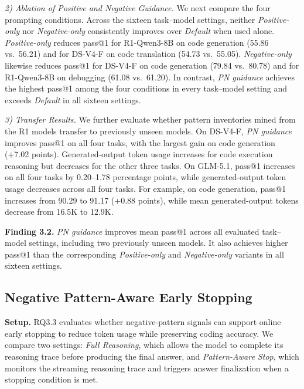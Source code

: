 \documentclass[acmsmall,screen,review,anonymous]{acmart}
\begin{document}
\textit{2) Ablation of Positive and Negative Guidance.}
We next compare the four prompting conditions. Across the sixteen task--model settings, neither \textit{Positive-only} nor \textit{Negative-only} consistently improves over \textit{Default} when used alone. \textit{Positive-only} reduces pass@1 for R1-Qwen3-8B on code generation (55.86 vs.\ 56.21) and for DS-V4-F on code translation (54.73 vs.\ 55.05). \textit{Negative-only} likewise reduces pass@1 for DS-V4-F on code generation (79.84 vs.\ 80.78) and for R1-Qwen3-8B on debugging (61.08 vs.\ 61.20). In contrast, \textit{PN guidance} achieves the highest pass@1 among the four conditions in every task--model setting and exceeds \textit{Default} in all sixteen settings.

\textit{3) Transfer Results.}
We further evaluate whether pattern inventories mined from the R1 models transfer to previously unseen models. On DS-V4-F, \textit{PN guidance} improves pass@1 on all four tasks, with the largest gain on code generation (+7.02 points). Generated-output token usage increases for code execution reasoning but decreases for the other three tasks. On GLM-5.1, pass@1 increases on all four tasks by 0.20--1.78 percentage points, while generated-output token usage decreases across all four tasks. For example, on code generation, pass@1 increases from 90.29 to 91.17 (+0.88 points), while mean generated-output tokens decrease from 16.5K to 12.9K.

\begin{tcolorbox}[width=\linewidth, boxrule=0.8pt, left=2pt, right=2pt, top=2pt, bottom=2pt, colback=gray!10, colframe=black]
\textbf{Finding 3.2.}
\textit{PN guidance} improves mean pass@1 across all evaluated task--model settings, including two previously unseen models. It also achieves higher pass@1 than the corresponding \textit{Positive-only} and \textit{Negative-only} variants in all sixteen settings.
\end{tcolorbox}

\subsection{Negative Pattern-Aware Early Stopping}
\label{sec:RQ3.3}

\textbf{Setup.} 
RQ3.3 evaluates whether negative-pattern signals can support online early stopping to reduce token usage while preserving coding accuracy. We compare two settings: \emph{Full Reasoning}, which allows the model to complete its reasoning trace before producing the final answer, and \emph{Pattern-Aware Stop}, which monitors the streaming reasoning trace and triggers answer finalization when a stopping condition is met.
\end{document}
